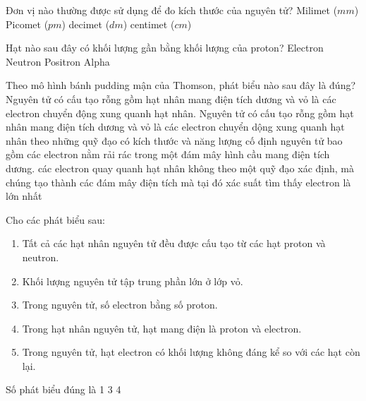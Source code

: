 \begin{ex}%
	Đơn vị nào thường được sử dụng để đo kích thước của nguyên tử?
	\choice
	{Milimet ($mm$)}
	{\True Picomet ($pm$)}
	{decimet ($dm$)}
	{centimet ($cm$)}
\end{ex}

\begin{ex}%
	Hạt nào sau đây có khối lượng gần bằng khối lượng của proton?
	\choice
	{Electron}
	{\True Neutron}
	{Positron}
	{Alpha}
\end{ex}
\begin{ex}%
	Theo mô hình bánh pudding mận của Thomson, phát biểu nào sau đây là đúng?
	\choice
	{%
		Nguyên tử có cấu tạo rỗng gồm hạt nhân mang điện tích dương và vỏ là các electron chuyển động xung quanh hạt nhân.
	}
	{%
		Nguyên tử có cấu tạo rỗng gồm hạt nhân mang điện tích dương và vỏ là các electron chuyển dộng xung quanh hạt nhân theo những quỹ đạo có kích thước và năng lượng cố định
	}
	{%
		\True	nguyên tử bao gồm các electron nằm rải rác trong một đám mây hình cầu mang điện tích dương.
	}
	{%
		các electron  quay quanh hạt nhân không theo một quỹ đạo xác định, mà chúng tạo thành các đám mây điện tích mà tại đó xác suất tìm thấy electron là lớn nhất
	}
\end{ex}

\begin{ex}%
	Cho các phát biểu sau:
	\begin{enumerate}[(1)]
		\item Tất cả các hạt nhân nguyên tử đều được cấu tạo từ các hạt proton và neutron.
		\item Khối lượng nguyên tử tập trung phần lớn ở lớp vỏ.
		\item Trong nguyên tử, số electron bằng số proton.
		\item Trong hạt nhân nguyên tử, hạt mang điện là proton và electron.
		\item Trong nguyên tử, hạt electron có khối lượng không đáng kể so với các hạt còn lại.
	\end{enumerate}
	Số phát biểu đúng là
	\choice
	{%
		1
	}
	{%
	}
	{%
		3
	}
	{%
		4
	}
\end{ex}

